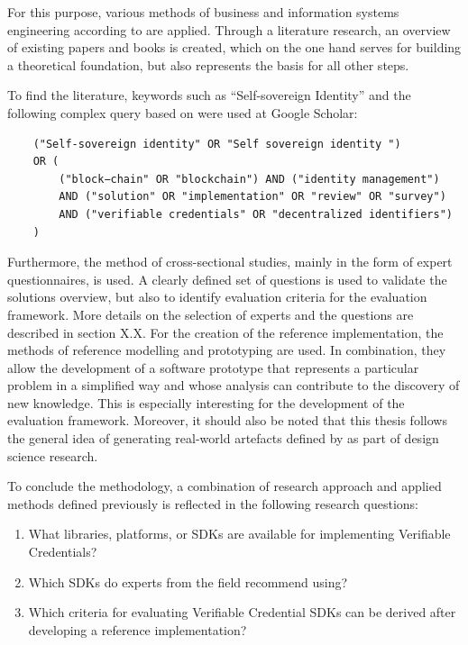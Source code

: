     For this purpose, various methods of business and information systems engineering according to \cite{wilde_forschungsmethoden_2007} are applied. Through a literature research, an overview of existing papers and books is created, which on the one hand serves for building a theoretical foundation, but also represents the basis for all other steps. 
    
    To find the literature, keywords such as “Self-sovereign Identity” and the following complex query based on \cite{van_bokkem_self-sovereign_2019} were used at Google Scholar:
    \begin{verbatim}
    ("Self-sovereign identity" OR "Self sovereign identity ") 
    OR ( 
        ("block−chain" OR "blockchain") AND ("identity management")
        AND ("solution" OR "implementation" OR "review" OR "survey")            
        AND ("verifiable credentials" OR "decentralized identifiers")
    )
    \end{verbatim}
    Furthermore, the method of cross-sectional studies, mainly in the form of expert questionnaires, is used. A clearly defined set of questions is used to validate the solutions overview, but also to identify evaluation criteria for the evaluation framework. More details on the selection of experts and the questions are described in section X.X. For the creation of the reference implementation, the methods of reference modelling and prototyping are used. In combination, they allow the development of a software prototype that represents a particular problem in a simplified way and whose analysis can contribute to the discovery of new knowledge. This is especially interesting for the development of the evaluation framework. Moreover, it should also be noted that this thesis follows the general idea of generating real-world artefacts defined by \cite{hevner_three_2007} as part of design science research.
    
    To conclude the methodology, a combination of research approach and applied methods defined previously is reflected in the following research questions: 
    
    \begin{enumerate}
      \item What libraries, platforms, or SDKs are available for implementing Verifiable Credentials?
      \item Which SDKs do experts from the field recommend using?
      \item Which criteria for evaluating Verifiable Credential SDKs can be derived after developing a reference implementation?
    \end{enumerate}